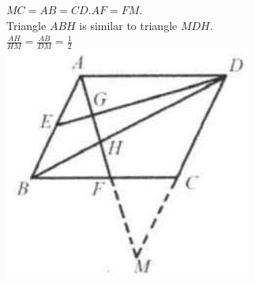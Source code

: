\documentclass{article}
\begin{document}
\(M C=A B=C D . A F=F M\).\\
Triangle \(A B H\) is similar to triangle \(M D H\).\\
\(\frac{A H}{H M}=\frac{A B}{D M}=\frac{1}{2}\)\\
\centering
\includegraphics[width=\textwidth]{images/141(3).jpg}
\end{document}
